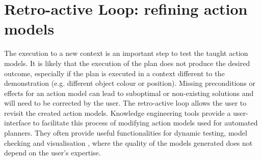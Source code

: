\section{Retro-active Loop: refining action models}
The execution to a new context is an important step to test the taught action models. It is likely that the execution of the plan does not produce the desired outcome, especially if the plan is executed in a context different to the demonstration (e.g. different object colour or position). Missing preconditions or effects for an action model can lead to suboptimal or non-existing solutions and will need to be corrected by the user. The retro-active loop allows the user to revisit the created action models. Knowledge engineering tools provide a user-interface to facilitate this process of modifying action models used for automated planners. They often provide useful functionalities for dynamic testing, model checking and visualisation \cite{simpson2007planning}, where the quality of the models generated does not depend on the user's expertise. 